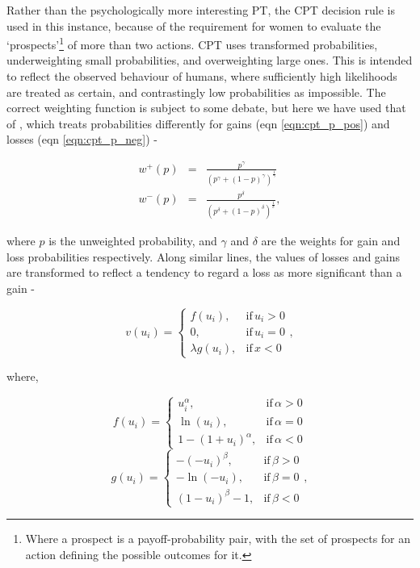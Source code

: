 Rather than the psychologically more interesting \ac{PT}, the \ac{CPT}
decision rule is used in this instance, because of the requirement
for women to evaluate the `prospects'\footnote{Where a prospect is a payoff-probability pair, with the set of prospects for an action defining the possible outcomes for it.} of more than two actions. \ac{CPT} uses transformed probabilities, underweighting
small probabilities, and overweighting large ones. This is intended to reflect the observed behaviour of humans, where sufficiently high likelihoods are treated as certain, and contrastingly low probabilities as impossible. The correct weighting function is subject to some debate, but here we have used that of \citet{Tversky1992}, which treats probabilities differently for gains (eqn \ref{eqn:cpt_p_pos}) and losses (eqn \ref{eqn:cpt_p_neg}) -

\begin{align}
w^{+}(p) & = & \frac{p^{\gamma}}{(p^{\gamma}+(1-p)^{\gamma})^{\frac{1}{\gamma}}}\label{eqn:cpt_p_pos}\\
w^{-}(p) & = & \frac{p^{\delta}}{(p^{\delta}+(1-p)^{\delta})^{\frac{1}{\delta}}}\label{eqn:cpt_p_neg},
\end{align}


where $p$ is the unweighted probability, and $\gamma$ and $\delta$
are the weights for gain and loss probabilities respectively. Along similar lines, the values of losses and gains are transformed to reflect a tendency to regard a loss as more significant than a gain  -

\begin{equation}
v(u_{i})=\begin{cases}
f(u_{i}),& \text{if}\, u_{i}>0\\
0,& \text{if}\, u_{i}=0\\
\lambda g(u_{i}),& \text{if}\, x<0
\end{cases},
\end{equation}


where,

\begin{equation}
f(u_{i})=\begin{cases}
u_{i}^{\alpha},& \text{if}\,\alpha>0\\
\ln(u_{i}),& \text{if}\,\alpha=0\\
1-(1+u_{i})^{\alpha},& \text{if}\,\alpha<0
\end{cases}
\end{equation}
\begin{equation}
g(u_{i})=\begin{cases}
-(-u_{i})^{\beta},& \text{if}\,\beta>0\\
-\ln(-u_{i}),& \text{if}\,\beta=0\\
(1-u_{i})^{\beta}-1,& \text{if}\,\beta<0
\end{cases},
\end{equation}


